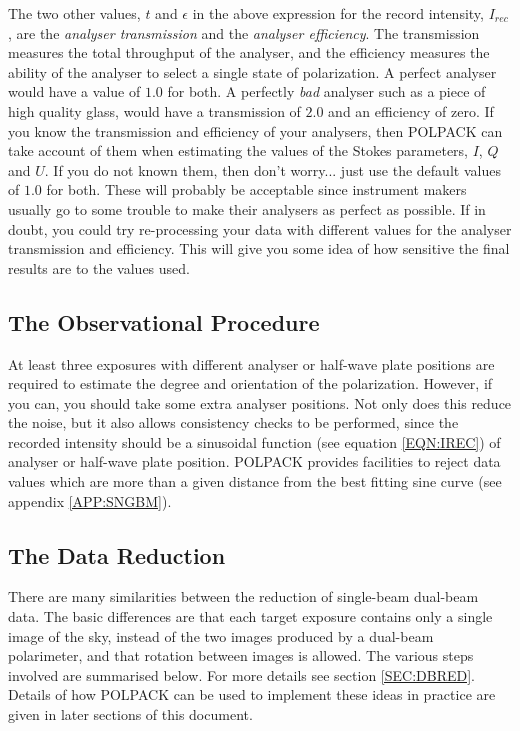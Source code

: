 \documentclass[twoside,11pt]{article}
\newcommand{\hyperref}[4]{#2\ref{#4}#3}
\renewcommand{\_}{\texttt{\symbol{95}}}
\begin{document}
The two other values, $t$ and $\epsilon$ in the above expression for the
record intensity, $I_{rec}$, are the \emph{analyser transmission} and the
\emph{analyser efficiency}. The transmission measures the total
throughput of the analyser, and the efficiency measures the ability of
the analyser to select a single state of polarization. A perfect analyser
would have a value of $1.0$ for both. A perfectly \emph{bad} analyser
such as a piece of high quality glass, would have a transmission of $2.0$
and an efficiency of zero. If you know the transmission and efficiency of
your analysers, then POLPACK can take account of them when estimating the
values of the Stokes parameters, $I$, $Q$ and $U$. If you do not known
them, then don't worry... just use the default values of $1.0$ for both.
These will probably be acceptable since instrument makers usually go to
some trouble to make their analysers as perfect as possible. If in doubt,
you could try re-processing your data with different values for the
analyser transmission and efficiency. This will give you some idea of how
sensitive the final results are to the values used.

\subsection{The Observational Procedure}
At least three exposures with different analyser or half-wave plate
positions are required to estimate the degree and orientation of the
polarization. However, if you can, you should take some extra analyser 
positions. Not only does this reduce the noise, but it also allows 
consistency checks to be performed, since the recorded intensity should 
be a \hyperref{sinusoidal function}{sinusoidal function (see equation }
{)}{EQN:IREC} of analyser or half-wave plate position. POLPACK provides 
facilities to reject data values which are more than a given distance from 
the best fitting sine curve (\hyperref{more details here}{see appendix }{}
{APP:SNGBM}).

\subsection{The Data Reduction}
There are many similarities between the reduction of single-beam
dual-beam data. The basic differences are that each target exposure
contains only a single image of the sky, instead of the two images
produced by a dual-beam polarimeter, and that rotation between images is
allowed. The various steps involved are
summarised below. For more details \hyperref{go here}{see section }
{}{SEC:DBRED}. Details of how POLPACK can be used to implement these
ideas in practice are given in later sections of this document. 
\end{document}

